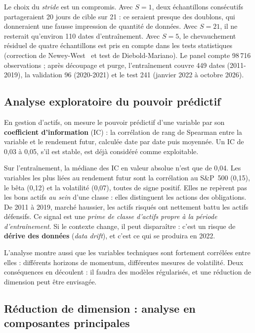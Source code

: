 Le choix du \emph{stride} est un compromis. Avec $S = 1$, deux échantillons consécutifs partageraient 20 jours de cible sur 21 : ce seraient presque des doublons, qui donneraient une fausse impression de quantité de données. Avec $S = 21$, il ne resterait qu'environ 110 dates d'entraînement. Avec $S = 5$, le chevauchement résiduel de quatre échantillons est pris en compte dans les tests statistiques (correction de Newey-West~\cite{newey1987} et test de Diebold-Mariano). Le panel compte 98\,716 observations ; après découpage et purge, l'entraînement couvre 449 dates (2011-2019), la validation 96 (2020-2021) et le test 241 (janvier 2022 à octobre 2026).

\subsection{Analyse exploratoire du pouvoir prédictif}

En gestion d'actifs, on mesure le pouvoir prédictif d'une variable par son \textbf{coefficient d'information} (IC) : la corrélation de rang de Spearman entre la variable et le rendement futur, calculée date par date puis moyennée. Un IC de 0,03 à 0,05, s'il est stable, est déjà considéré comme exploitable.

Sur l'entraînement, la médiane des IC en valeur absolue n'est que de 0,04. Les variables les plus liées au rendement futur sont la corrélation au S\&P~500 (0,15), le bêta (0,12) et la volatilité (0,07), toutes de signe positif. Elles ne repèrent pas les bons actifs \emph{au sein} d'une classe : elles distinguent les actions des obligations. De 2011 à 2019, marché haussier, les actifs risqués ont nettement battu les actifs défensifs. Ce \og signal \fg{} est une \emph{prime de classe d'actifs propre à la période d'entraînement}. Si le contexte change, il peut disparaître : c'est un risque de \textbf{dérive des données} (\emph{data drift}), et c'est ce qui se produira en 2022.

L'analyse montre aussi que les variables techniques sont fortement corrélées entre elles : différents horizons de momentum, différentes mesures de volatilité. Deux conséquences en découlent : il faudra des modèles régularisés, et une réduction de dimension peut être envisagée.

\subsection{Réduction de dimension : analyse en composantes principales}

